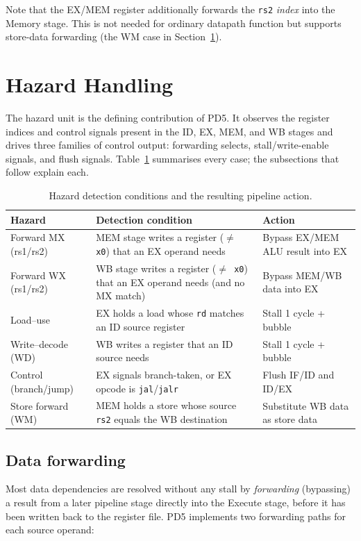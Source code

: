 \documentclass[11pt,a4paper]{article}
\newcommand{\sig}[1]{\texttt{#1}}
\begin{document}
Note that the EX/MEM register additionally forwards the \sig{rs2} \emph{index} into the
Memory stage. This is not needed for ordinary datapath function but supports store-data
forwarding (the WM case in Section~\ref{sec:hazard}).

\section{Hazard Handling}
\label{sec:hazard}
The hazard unit is the defining contribution of PD5. It observes the register indices and
control signals present in the ID, EX, MEM, and WB stages and drives three families of
control output: forwarding selects, stall/write-enable signals, and flush signals.
Table~\ref{tab:hazards} summarises every case; the subsections that follow explain each.

\begin{table}[h]
\centering
\caption{Hazard detection conditions and the resulting pipeline action.}
\label{tab:hazards}
\small
\begin{tabular}{@{}l p{6.6cm} l@{}}
\toprule
\textbf{Hazard} & \textbf{Detection condition} & \textbf{Action} \\
\midrule
Forward MX (rs1/rs2) & MEM stage writes a register (\sig{$\neq$ x0}) that an EX operand needs & Bypass EX/MEM ALU result into EX \\
Forward WX (rs1/rs2) & WB stage writes a register (\sig{$\neq$ x0}) that an EX operand needs (and no MX match) & Bypass MEM/WB data into EX \\
Load--use & EX holds a load whose \sig{rd} matches an ID source register & Stall 1 cycle + bubble \\
Write--decode (WD) & WB writes a register that an ID source needs & Stall 1 cycle + bubble \\
Control (branch/jump) & EX signals branch-taken, or EX opcode is \sig{jal}/\sig{jalr} & Flush IF/ID and ID/EX \\
Store forward (WM) & MEM holds a store whose source \sig{rs2} equals the WB destination & Substitute WB data as store data \\
\bottomrule
\end{tabular}
\end{table}

\subsection{Data forwarding}
Most data dependencies are resolved without any stall by \emph{forwarding} (bypassing) a
result from a later pipeline stage directly into the Execute stage, before it has been
written back to the register file. PD5 implements two forwarding paths for each source
operand:
\end{document}
